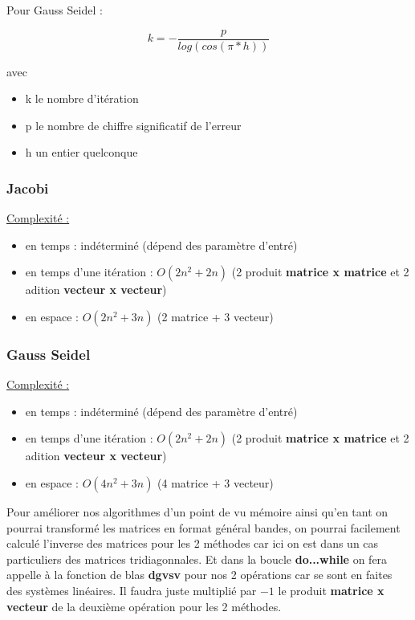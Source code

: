 \documentclass[11pt]{article}
\begin{document}
Pour Gauss Seidel :

\begin{equation*}
  k = - \frac{p}{log(cos(\pi * h))}
\end{equation*}

avec

\begin{itemize}
\item k le nombre d'itération
\item p le nombre de chiffre significatif de l'erreur
\item h un entier quelconque
\end{itemize}

\subsubsection{Jacobi}

\underline{Complexité :}

\begin{itemize}
\item en temps : indéterminé (dépend des paramètre d'entré)
\item en temps d'une itération : $O(2n^2 + 2n)$ (2 produit \textbf{matrice x
  matrice} et 2 adition \textbf{vecteur x vecteur})
\item en espace : $O(2n^2 + 3n)$ (2 matrice + 3 vecteur)
\end{itemize}

\subsubsection{Gauss Seidel}

\underline{Complexité :}

\begin{itemize}
\item en temps : indéterminé (dépend des paramètre d'entré)
\item en temps d'une itération : $O(2n^2 + 2n)$ (2 produit \textbf{matrice x
  matrice} et 2 adition \textbf{vecteur x vecteur})
\item en espace : $O(4n^2 + 3n)$ (4 matrice + 3 vecteur)
\end{itemize}

Pour améliorer nos algorithmes d'un point de vu mémoire ainsi qu'en
tant on pourrai transformé les matrices en format général bandes, on
pourrai facilement calculé l'inverse des matrices pour les 2 méthodes
car ici on est dans un cas particuliers des matrices
tridiagonnales. Et dans la boucle \textbf{do...while} on fera appelle
à la fonction de blas \textbf{dgvsv} pour nos 2 opérations car se sont
en faites des systèmes linéaires. Il faudra juste multiplié par $-1$
le produit \textbf{matrice x vecteur} de la deuxième opération pour
les 2 méthodes.
\end{document}
